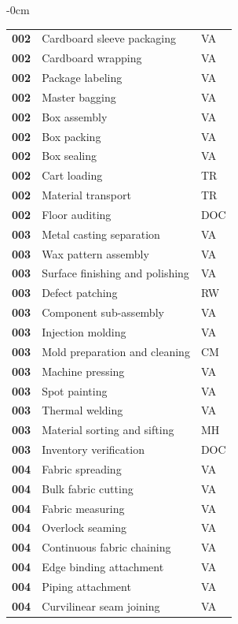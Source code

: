 \begin{table}[!t]
\begin{adjustwidth}{-\extralength}{0cm}
\begin{tabularx}{\linewidth}{@{}l L l@{}}
\textbf{002} & Cardboard sleeve packaging & VA \\
\textbf{002} & Cardboard wrapping & VA \\
\textbf{002} & Package labeling & VA \\
\textbf{002} & Master bagging & VA \\
\textbf{002} & Box assembly & VA \\
\textbf{002} & Box packing & VA \\
\textbf{002} & Box sealing & VA \\
\textbf{002} & Cart loading & TR \\
\textbf{002} & Material transport & TR \\
\textbf{002} & Floor auditing & DOC \\
\textbf{003} & Metal casting separation & VA \\
\textbf{003} & Wax pattern assembly & VA \\
\textbf{003} & Surface finishing and polishing & VA \\
\textbf{003} & Defect patching & RW \\
\textbf{003} & Component sub-assembly & VA \\
\textbf{003} & Injection molding & VA \\
\textbf{003} & Mold preparation and cleaning & CM \\
\textbf{003} & Machine pressing & VA \\
\textbf{003} & Spot painting & VA \\
\textbf{003} & Thermal welding & VA \\
\textbf{003} & Material sorting and sifting & MH \\
\textbf{003} & Inventory verification & DOC \\
\textbf{004} & Fabric spreading & VA \\
\textbf{004} & Bulk fabric cutting & VA \\
\textbf{004} & Fabric measuring & VA \\
\textbf{004} & Overlock seaming & VA \\
\textbf{004} & Continuous fabric chaining & VA \\
\textbf{004} & Edge binding attachment & VA \\
\textbf{004} & Piping attachment & VA \\
\textbf{004} & Curvilinear seam joining & VA \\
\bottomrule\end{tabularx}\end{adjustwidth}\end{table}
